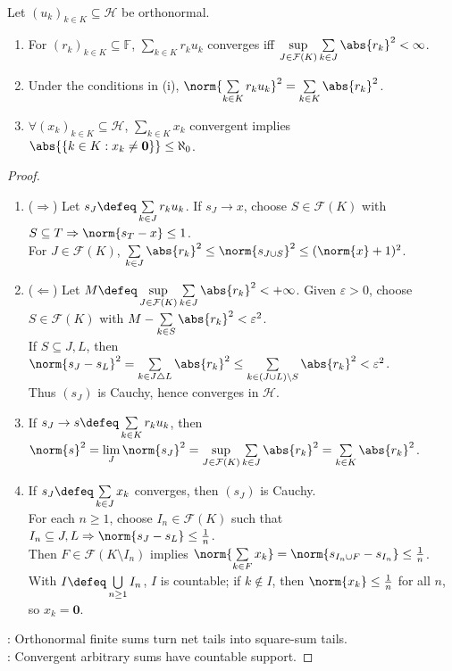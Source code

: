 \begin{theorem} \label{thm:arbitrary-orthonormal-sums-hilbert} \\
Let $(u_k)_{k\in K}\subseteq\mathcal{H}$ be orthonormal.
\begin{enumerate}[label=(\roman*)]
\setlength{\itemsep}{0pt}
\item For $(r_k)_{k\in K}\subseteq\mathbb{F}$, $\sum\limits_{k\in K}r_ku_k$ converges iff $\sup\limits_{J\in\mathcal{F}(K)}\sum\limits_{k\in J}\abs{r_k}^2<\infty$.
\item Under the conditions in (i), $\norm{\sum\limits_{k\in K}r_ku_k}^2=\sum\limits_{k\in K}\abs{r_k}^2$.
\item $\forall(x_k)_{k\in K}\subseteq\mathcal{H}$, $\sum\limits_{k\in K}x_k$ convergent implies $\abs{\{k\in K:x_k\neq\mathbf{0}\}}\leq\aleph_0$.
\end{enumerate}
\begin{proof}
\begin{enumerate}[label=(\roman*)]
\setlength{\itemsep}{0pt}
\item[$(i)$] ($\Rightarrow$) Let $s_J\defeq\sum\limits_{k\in J}r_ku_k$. If $s_J\to x$, choose $S\in\mathcal F(K)$ with $S\subseteq T\Rightarrow\norm{s_T-x}\leq1$.\\
For $J\in\mathcal F(K)$, $\sum\limits_{k\in J}\abs{r_k}^2\leq\norm{s_{J\cup S}}^2\leq(\norm{x}+1)^2$.
\item[$(i)$] ($\Leftarrow$) Let $M\defeq\sup\limits_{J\in\mathcal F(K)}\sum\limits_{k\in J}\abs{r_k}^2<+\infty$. Given $\varepsilon>0$, choose $S\in\mathcal F(K)$ with $M-\sum\limits_{k\in S}\abs{r_k}^2<\varepsilon^2$.\\
If $S\subseteq J,L$, then $\norm{s_J-s_L}^2=\sum\limits_{k\in J\triangle L}\abs{r_k}^2\leq\sum\limits_{k\in(J\cup L)\setminus S}\abs{r_k}^2<\varepsilon^2$.\\
Thus $(s_J)$ is Cauchy, hence converges in $\mathcal H$.
\item[$(ii)$] If $s_J\to s\defeq\sum\limits_{k\in K}r_ku_k$, then $\norm{s}^2=\lim\limits_J\norm{s_J}^2=\sup\limits_{J\in\mathcal F(K)}\sum\limits_{k\in J}\abs{r_k}^2=\sum\limits_{k\in K}\abs{r_k}^2$.
\item[$(iii)$] If $s_J\defeq\sum\limits_{k\in J}x_k$ converges, then $(s_J)$ is Cauchy.\\
For each $n\geq1$, choose $I_n\in\mathcal F(K)$ such that $I_n\subseteq J,L\Rightarrow\norm{s_J-s_L}\leq\frac{1}{n}$.\\
Then $F\in\mathcal F(K\setminus I_n)$ implies $\norm{\sum\limits_{k\in F}x_k}=\norm{s_{I_n\cup F}-s_{I_n}}\leq\frac{1}{n}$.\\
With $I\defeq\bigcup\limits_{n\geq1}I_n$, $I$ is countable; if $k\notin I$, then $\norm{x_k}\leq\frac{1}{n}$ for all $n$, so $x_k=\mathbf0$.
\end{enumerate}
: Orthonormal finite sums turn net tails into square-sum tails.\\
: Convergent arbitrary sums have countable support.
\end{proof}
\end{theorem}

